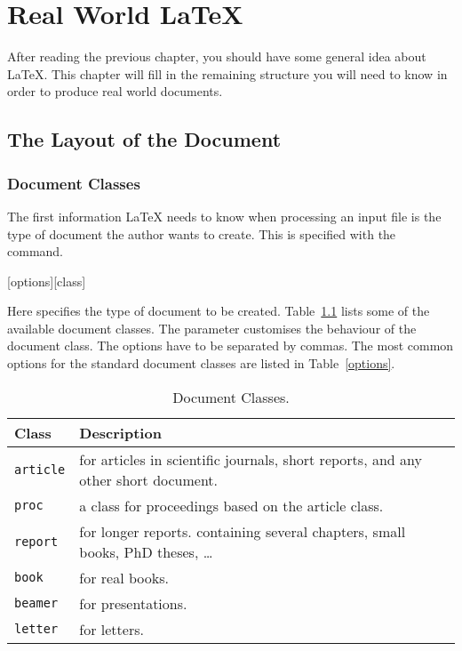 \chapter{Real World \LaTeX{}}\label{chap:realworld}

\begin{intro}
  After reading the previous chapter, you should have some general idea
  about \LaTeX{}. This chapter
  will fill in the remaining structure you will need to know in order
  to produce real world documents.
\end{intro}

\section{The Layout of the Document}

\subsection{Document Classes}\label{sec:documentclass}

The first information \LaTeX{} needs to know when processing an
input file is the type of document the author wants to create. This
is specified with the  command.
\begin{lscommand}
  [options][class]
\end{lscommand}
Here  specifies the type of document to be created.
Table~\ref{documentclasses} lists some of the available document classes. The
 parameter customises the behaviour of the document class.
The options have to be separated by commas. The most common options for the
standard document classes are listed in Table~\ref{options}.

\begin{table}
  \caption{Document Classes.}\label{documentclasses}
  \begin{tabular}{@{}lp{8cm}@{}}
    \toprule
    Class                                 & Description               \\
    \midrule
    \texttt{article}\index{article class} & for articles in
    scientific journals, short reports, and any other short document. \\
    \texttt{proc}\index{proc class}       & a class for
    proceedings based on the article class.                           \\
    \texttt{report}\index{report class}   & for longer reports.
    containing several chapters, small books, PhD theses, \ldots      \\
    \texttt{book}\index{book class}       & for real books.           \\
    \texttt{beamer}\index{beamer class}   & for presentations.        \\
    \texttt{letter}\index{letter class}   & for letters.              \\
    \bottomrule
  \end{tabular}
\end{table}

